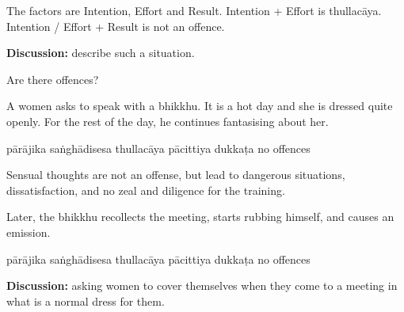 \begin{exam}{\autoExamName}
\begin{problem}
  \bigskip

  \begin{solution}
    The factors are Intention, Effort and Result. Intention + Effort is
    thullacāya. Intention / Effort + Result is not an offence.
  \end{solution}

  \textbf{Discussion:} describe such a situation.

\end{problem}

\problemDivide

\begin{problem*}

  Are there offences?

\begin{parts}

\item
  A women asks to speak with a bhikkhu.
  It is a hot day and she is dressed quite openly.
  For the rest of the day, he continues fantasising about her.

  \bigskip

  \begin{answers}{6}
    \bChoices
     pārājika\eAns
     saṅghādisesa\eAns
     thullacāya\eAns
     pācittiya\eAns
     dukkaṭa\eAns
     no offences\eAns
    \eChoices
  \end{answers}

  \begin{solution}
    Sensual thoughts are not an offense, but lead to dangerous situations,
    dissatisfaction, and no zeal and diligence for the training.
  \end{solution}

  \bigskip

  \item Later, the bhikkhu recollects the meeting, starts rubbing himself, and causes an emission.

  \bigskip

  \begin{answers}{6}
    \bChoices
     pārājika\eAns
     saṅghādisesa\eAns
     thullacāya\eAns
     pācittiya\eAns
     dukkaṭa\eAns
     no offences\eAns
    \eChoices
  \end{answers}

  \bigskip

  \textbf{Discussion:} asking women to cover themselves when they come to a
  meeting in what is a normal dress for them.

  \bigskip

\end{parts}

\end{problem*}

\end{exam}
